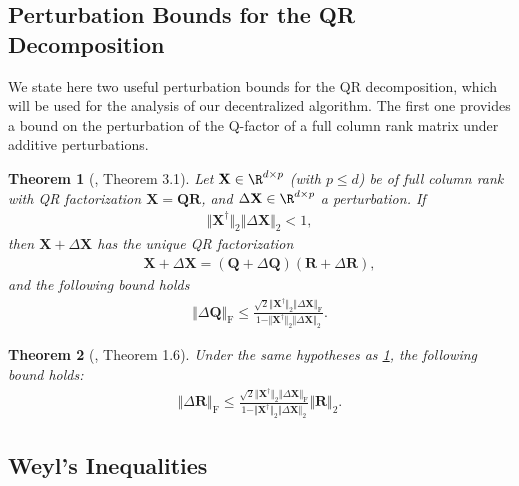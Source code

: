 \documentclass{article}
\theoremstyle{plain}
\newtheorem{theorem}{Theorem}[section]
\theoremstyle{definition}
\theoremstyle{remark}
\begin{document}
\subsection{Perturbation Bounds for the QR Decomposition}

We state here two useful perturbation bounds for the QR decomposition, which will be used for the analysis of our decentralized algorithm. The first one provides a bound on the perturbation of the Q-factor of a full column rank matrix under additive perturbations.

\begin{theorem}[{\citet{chang2012}, Theorem 3.1}]\label{lemma:q-bound}
    Let $\mathbf{X} \in \R^{d \times p}$ (with $p \leqslant d$) be of full column rank with QR factorization $\mathbf{X} = \mathbf{Q}\mathbf{R}$, and $\Delta \mathbf{X} \in \R^{d \times p}$ a perturbation. If 
    \begin{align*}
        \Vert \mathbf{X}^\dagger\Vert_2 \Vert \Delta\mathbf{X}\Vert_2 < 1,
    \end{align*}
    then $\mathbf{X} + \Delta\mathbf{X}$ has the unique QR factorization
    \begin{align*}
        \mathbf{X} + \Delta\mathbf{X} = (\mathbf{Q} + \Delta \mathbf{Q})(\mathbf{R} + \Delta\mathbf{R}),
    \end{align*}
    and the following bound holds
    \begin{align*}
        \Vert \Delta\mathbf{Q} \Vert_\mathrm{F} \leqslant \frac{\sqrt{2}\Vert\mathbf{X}^\dagger\Vert_2 \Vert \Delta\mathbf{X}\Vert_\mathrm{F}}{1 - \Vert\mathbf{X}^\dagger\Vert_2 \Vert \Delta\mathbf{X}\Vert_2}.
    \end{align*}
\end{theorem}


\begin{theorem}[{\citet{sun91}, Theorem 1.6}]\label{lemma:r-bound}
    Under the same hypotheses as \cref{lemma:q-bound}, the following bound holds:
    \begin{align*}
        \Vert \Delta \mathbf{R}\Vert_\mathrm{F} \leqslant \frac{\sqrt{2}\Vert\mathbf{X}^\dagger\Vert_2 \Vert \Delta\mathbf{X}\Vert_\mathrm{F}}{1 - \Vert\mathbf{X}^\dagger\Vert_2 \Vert \Delta\mathbf{X}\Vert_2} \Vert \mathbf{R}\Vert_2.
    \end{align*}
\end{theorem}

\subsection{Weyl's Inequalities}
\end{document}
